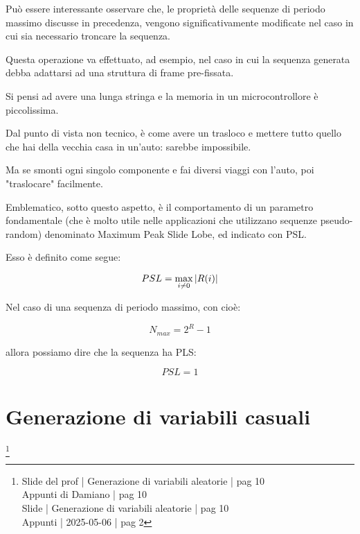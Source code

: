 Può essere interessante osservare che, 
le proprietà delle sequenze di periodo massimo discusse in precedenza, 
vengono significativamente modificate nel caso in cui sia necessario troncare la sequenza. \newline 

Questa operazione va effettuato, ad esempio, nel caso in cui la sequenza generata debba adattarsi ad una struttura di frame pre-fissata. \newline 

\begin{tcolorbox}
    Si pensi ad avere una lunga stringa e la memoria in un microcontrollore è piccolissima. \newline 

    Dal punto di vista non tecnico, 
    è come avere un trasloco e mettere tutto quello che hai della vecchia casa in un'auto: 
    sarebbe impossibile. \newline 

    Ma se smonti ogni singolo componente e fai diversi viaggi con l'auto, 
    poi "traslocare" facilmente. 
\end{tcolorbox}

Emblematico, sotto questo aspetto, è il comportamento di un parametro fondamentale (che è molto utile nelle applicazioni che utilizzano sequenze pseudo-random) denominato Maximum Peak Slide Lobe, 
ed indicato con PSL. \newline 

Esso è definito come segue: 

{
	\Large 
	\begin{equation}
	PSL = \max_{i \neq 0} \abs{R(i)}
	\end{equation}

}

Nel caso di una sequenza di periodo massimo, 
con cioè:

{
    \Large 
    \begin{equation}
        N_{max} = 2^{R} - 1
    \end{equation}
}

allora possiamo dire che la sequenza ha PLS: 

{
    \Large 
    \begin{equation}
        PSL = 1
    \end{equation}
}

\newpage 

\section{Generazione di variabili casuali}
\footnote{Slide del prof | Generazione di variabili aleatorie | pag 10 \\
Appunti di Damiano | pag 10 \\ 
Slide | Generazione di variabili aleatorie | pag  10\\ 
Appunti | 2025-05-06 | pag 2
} 

